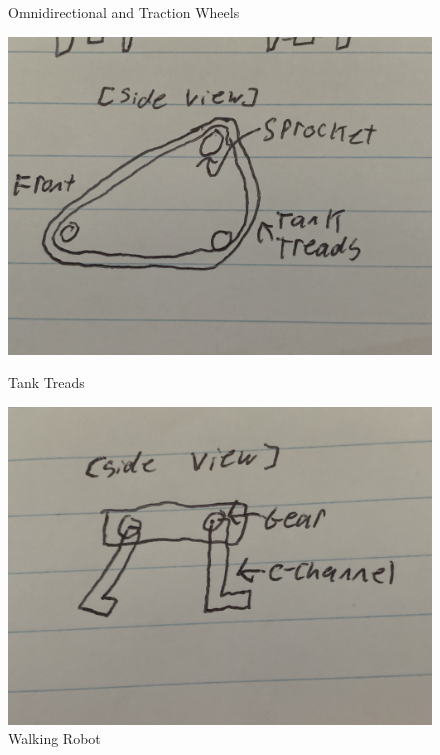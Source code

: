 \begin{figure}[hbt!]
\begin{minipage}{.5\textwidth}
        \caption{Omnidirectional and Traction Wheels} %
        \label{fig:omnidirectional-and-traction-wheels}
    \end{minipage}
     \begin{minipage}{.5\textwidth}
        \centering
        \includegraphics[width=.8\linewidth]{images/Tank - Treads.jpg}
        \caption{Tank Treads}
        \label{fig:tank-treads}
    \end{minipage}
     \begin{minipage}{.5\textwidth}
        \centering
        \includegraphics[width=.8\linewidth]{images/Walking Robot.jpg}
        \caption{Walking Robot}
        \label{fig:walking-robot}
    \end{minipage}
\end{figure}
\pagebreak
{}
